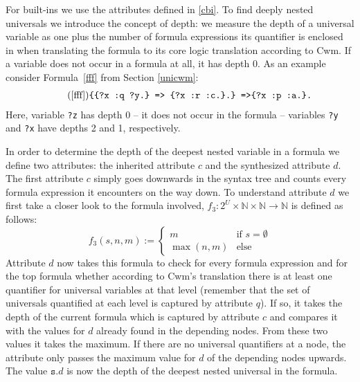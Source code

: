 For built-ins we use the attributes defined in \ref{cbi}.
%
To find deeply nested universals we introduce the concept of depth: we measure the depth of a universal variable as one plus
the number of formula expressions its quantifier is enclosed in when translating the \nthree formula 
to its core logic translation according
to Cwm. If a variable does not occur in a formula at all, it has depth 0. As an example consider Formula~\ref{fff} from Section \ref{unicwm}:
\begin{multline}\tag{\ref{fff}}
\texttt{\{\{?x :q ?y.\} => \{?x :r :c.\}.\} =>}
\texttt{\{?x :p :a.\}.}
\end{multline}
Here, variable \texttt{?z} has depth 0 -- it does not occur in the formula --  variables \texttt{?y} and \texttt{?x} have depths 2 and 1, respectively. 

In order to determine the depth of the deepest nested variable in a formula we define two attributes: the inherited attribute $c$ and the synthesized attribute $d$. The first attribute $c$
simply goes downwards in the syntax tree and counts every formula expression it encounters on the way down.  
To understand attribute $d$ we first take a closer look to the formula involved,
$f_3: 2^{U}\times\mathbb{N}\times\mathbb{N}\rightarrow \mathbb{N}$ is defined as follows:
\[
 f_3(s, n, m) := \begin{cases}
                  m &\text{if } s=\emptyset\\
                  \max(n,m) &\text{else}
                     \end{cases}
\]
Attribute $d$ now takes this formula to check for every formula expression and for the top formula whether
according to Cwm's translation there is at least one quantifier for universal variables  at that level (remember that the set of universals quantified at each level is captured by
attribute $q$). If so, it takes the depth of the current formula which is captured by attribute $c$ 
and compares it with the values for $d$ already found in the depending nodes. From these two values it takes the maximum. 
If there are no universal quantifiers at a node, the attribute only passes the maximum value for $d$ of the depending nodes upwards. The value $\texttt{s}.d$ is now the depth of the deepest 
nested universal in the formula.

